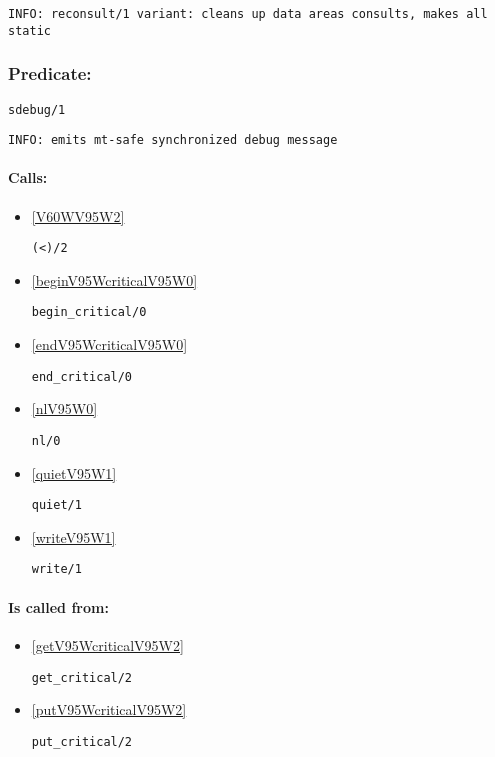 {\small \begin{verbatim}
INFO: reconsult/1 variant: cleans up data areas consults, makes all static

\end{verbatim}}

\subsubsection{Predicate:} \label{sdebugV95W1}

\begin{verbatim}
sdebug/1
\end{verbatim}

{\small \begin{verbatim}
INFO: emits mt-safe synchronized debug message

\end{verbatim}}
\paragraph{Calls:} 
\begin{itemize}
\item \ref{V60WV95W2} 
\begin{verbatim}
(<)/2
\end{verbatim}

\item \ref{beginV95WcriticalV95W0} 
\begin{verbatim}
begin_critical/0
\end{verbatim}

\item \ref{endV95WcriticalV95W0} 
\begin{verbatim}
end_critical/0
\end{verbatim}

\item \ref{nlV95W0} 
\begin{verbatim}
nl/0
\end{verbatim}

\item \ref{quietV95W1} 
\begin{verbatim}
quiet/1
\end{verbatim}

\item \ref{writeV95W1} 
\begin{verbatim}
write/1
\end{verbatim}

\end{itemize}
\paragraph{Is called from:} 
\begin{itemize}
\item \ref{getV95WcriticalV95W2} 
\begin{verbatim}
get_critical/2
\end{verbatim}

\item \ref{putV95WcriticalV95W2} 
\begin{verbatim}
put_critical/2
\end{verbatim}

\end{itemize}


